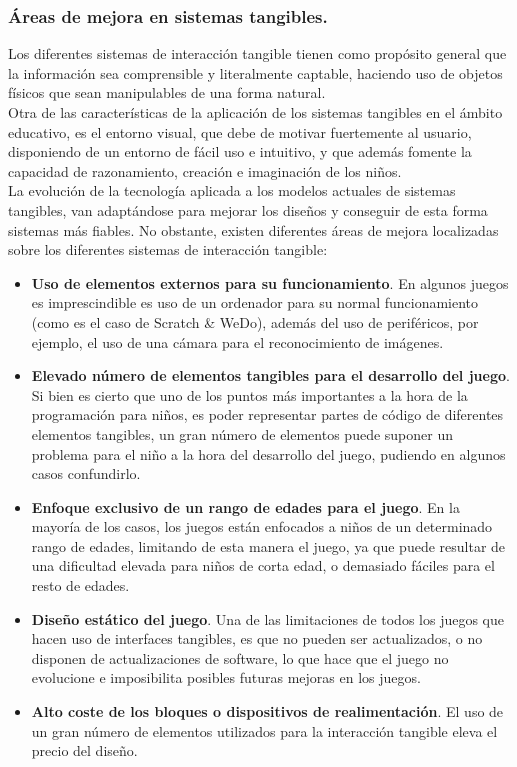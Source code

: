 \subsubsection{Áreas de mejora en sistemas tangibles.}
Los diferentes sistemas de interacción tangible tienen como propósito general que la
información sea comprensible y literalmente captable, haciendo uso de objetos físicos
que sean manipulables de una forma natural.\\
Otra de las características de la aplicación de los sistemas tangibles en el ámbito
educativo, es el entorno visual, que debe de motivar fuertemente al usuario, disponiendo
de un entorno de fácil uso e intuitivo, y que además fomente la capacidad de
razonamiento, creación e imaginación de los niños.\\
La evolución de la tecnología aplicada a los modelos actuales de sistemas tangibles, van
adaptándose para mejorar los diseños y conseguir de esta forma sistemas más fiables.
No obstante, existen diferentes áreas de mejora localizadas sobre los diferentes
sistemas de interacción tangible:\
\begin{itemize}
\item \textbf{Uso de elementos externos para su funcionamiento}. En algunos juegos es
imprescindible es uso de un ordenador para su normal funcionamiento (como es
el caso de Scratch \& WeDo), además del uso de periféricos, por ejemplo, el uso
de una cámara para el reconocimiento de imágenes.
\item \textbf{Elevado número de elementos tangibles para el desarrollo del juego}. Si bien es cierto que uno de los puntos más importantes a la hora de la programación para
niños, es poder representar partes de código de diferentes elementos tangibles,
un gran número de elementos puede suponer un problema para el niño a la hora
del desarrollo del juego, pudiendo en algunos casos confundirlo.
\item \textbf{Enfoque exclusivo de un rango de edades para el juego}. En la mayoría de los casos, los juegos están enfocados a niños de un determinado rango de edades,
limitando de esta manera el juego, ya que puede resultar de una dificultad
elevada para niños de corta edad, o demasiado fáciles para el resto de edades.
\item \textbf{Diseño estático del juego}. Una de las limitaciones de todos los juegos que hacen uso de interfaces tangibles, es que no pueden ser actualizados, o no disponen de
actualizaciones de software, lo que hace que el juego no evolucione e imposibilita posibles futuras mejoras en los juegos.
\item \textbf{Alto coste de los bloques o dispositivos de realimentación}. El uso de un gran número de elementos utilizados para la interacción tangible eleva el precio del
diseño.
\end{itemize}

